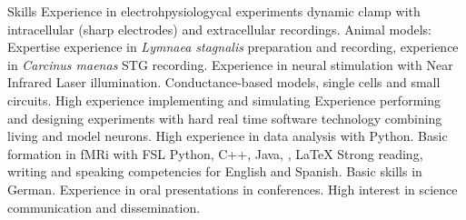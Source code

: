 \begin{rubric}{Skills}
\entry*[Electrophysiology]
	Experience in electrohpysiologycal experiments dynamic clamp with intracellular (sharp electrodes) and extracellular recordings. Animal models: Expertise experience in \textit{Lymnaea stagnalis} preparation and recording, experience in \textit{Carcinus maenas} STG recording.
    Experience in neural stimulation with Near Infrared Laser illumination.
    Conductance-based models, single cells and small circuits. High experience implementing and simulating 
 Experience performing and designing experiments with hard real time software technology combining living and model neurons. 
    High experience in data analysis with Python. Basic formation in fMRi with FSL
	Python, C++, Java, , \LaTeX
\entry*[Languages]
	Strong reading, writing and speaking competencies for English and Spanish. Basic skills in German.
 Experience in oral presentations in conferences. High interest in science communication and dissemination.

\end{rubric}
